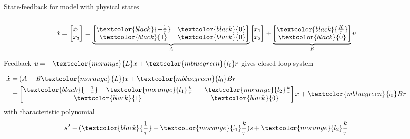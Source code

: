 \documentclass[presentation,aspectratio=169]{beamer}
\begin{document}
\begin{frame}[label={sec:org45d4d4b}]{State-feedback for model with physical states}
\begin{columns}
\begin{column}{0.4\columnwidth}
\[ \dot{x} = \begin{bmatrix} \dot{x}_1\\\dot{x}_2\end{bmatrix} = \underbrace{\begin{bmatrix} \textcolor{black}{-\frac{1}{\tau}} & \textcolor{black}{0} \\\textcolor{black}{1} & \textcolor{black}{0} \end{bmatrix}}_{A} \begin{bmatrix} x_1\\x_2\end{bmatrix} + \underbrace{\begin{bmatrix} \textcolor{black}{\frac{K}{\tau}} \\ \textcolor{black}{0} \end{bmatrix}}_{B} u \]

Feedback \(u = -\textcolor{morange}{L}x + \textcolor{mbluegreen}{l_0} r\) gives closed-loop system

\begin{align*}
  \dot{x} &= (A-B\textcolor{morange}{L})x + \textcolor{mbluegreen}{l_0}Br\\
  &= \begin{bmatrix} \textcolor{black}{-\frac{1}{\tau}} -\textcolor{morange}{l_1}\frac{k}{\tau} & - \textcolor{morange}{l_2}\frac{k}{\tau} \\\textcolor{black}{1} & \textcolor{black}{0} \end{bmatrix} x + \textcolor{mbluegreen}{l_0} B r
  \end{align*}
with characteristic polynomial
\[s^2 + (\textcolor{black}{\frac{1}{\tau}}  + \textcolor{morange}{l_1}\frac{k}{\tau})s +  \textcolor{morange}{l_2}\frac{k}{\tau} \]
\end{column}


\begin{column}{0.4\columnwidth}
\begin{center}
\end{center}
\end{column}
\end{columns}
\end{frame}
\end{document}
